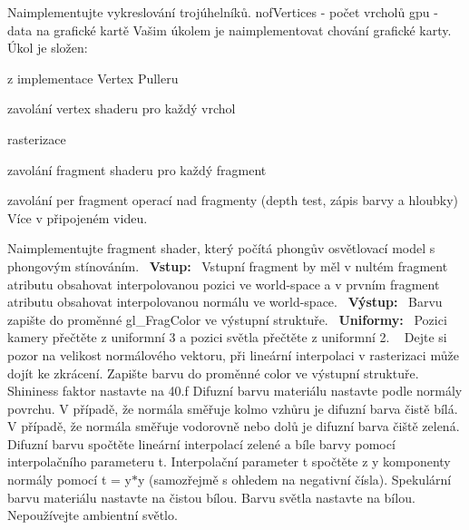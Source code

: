 
\begin{DoxyRefList}
\item[\label{todo__todo000001}%
\Hypertarget{todo__todo000001}%
Global \hyperlink{group__gpu__side_gad786da6785f12139855c4484767a45fb}{gpu\+\_\+draw\+Triangles} (\hyperlink{structGPU}{G\+PU} $\ast$const gpu, uint32\+\_\+t nof\+Vertices)]Naimplementujte vykreslování trojúhelníků. nof\+Vertices -\/ počet vrcholů gpu -\/ data na grafické kartě Vašim úkolem je naimplementovat chování grafické karty. Úkol je složen\+:
\begin{DoxyEnumerate}
\item z implementace Vertex Pulleru
\item zavolání vertex shaderu pro každý vrchol
\item rasterizace
\item zavolání fragment shaderu pro každý fragment
\item zavolání per fragment operací nad fragmenty (depth test, zápis barvy a hloubky) Více v připojeném videu.  
\end{DoxyEnumerate}
\item[\label{todo__todo000003}%
\Hypertarget{todo__todo000003}%
Global \hyperlink{group__shader__side_gae61352614f36dbf1625c51d6963d1aeb}{phong\+\_\+\+FS} (\hyperlink{structGPUFragmentShaderData}{G\+P\+U\+Fragment\+Shader\+Data} $\ast$const data)]Naimplementujte fragment shader, který počítá phongův osvětlovací model s phongovým stínováním.~\newline
 {\bfseries Vstup\+:}~\newline
 Vstupní fragment by měl v nultém fragment atributu obsahovat interpolovanou pozici ve world-\/space a v prvním fragment atributu obsahovat interpolovanou normálu ve world-\/space.~\newline
 {\bfseries Výstup\+:}~\newline
 Barvu zapište do proměnné gl\+\_\+\+Frag\+Color ve výstupní struktuře.~\newline
 {\bfseries Uniformy\+:}~\newline
 Pozici kamery přečtěte z uniformní 3 a pozici světla přečtěte z uniformní 2. ~\newline
 Dejte si pozor na velikost normálového vektoru, při lineární interpolaci v rasterizaci může dojít ke zkrácení. Zapište barvu do proměnné color ve výstupní struktuře. Shininess faktor nastavte na 40.\+f Difuzní barvu materiálu nastavte podle normály povrchu. V případě, že normála směřuje kolmo vzhůru je difuzní barva čistě bílá. V případě, že normála směřuje vodorovně nebo dolů je difuzní barva čiště zelená. Difuzní barvu spočtěte lineární interpolací zelené a bíle barvy pomocí interpolačního parameteru t. Interpolační parameter t spočtěte z y komponenty normály pomocí t = y$\ast$y (samozřejmě s ohledem na negativní čísla). Spekulární barvu materiálu nastavte na čistou bílou. Barvu světla nastavte na bílou. Nepoužívejte ambientní světlo.~\newline
  

\end{DoxyRefList}
